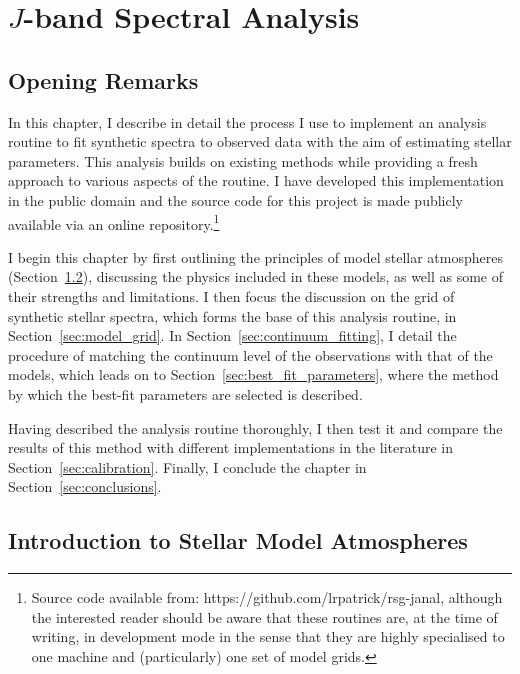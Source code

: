 \chapter{$J$-band Spectral Analysis}\label{ch:janal}
\renewcommand{\headrulewidth}{1pt}

\section{Opening Remarks} %
\label{sec:janalopening}

In this chapter, I describe in detail the process I use to implement an analysis
routine to fit synthetic spectra to observed data with the aim of estimating stellar parameters.
This analysis builds on existing methods while providing a fresh approach to various aspects of the routine.
I have developed this implementation in the public domain and the source code for this project is made publicly available
via an online repository.\footnote{Source code available from: https://github.com/lrpatrick/rsg-janal,
although the interested reader should be aware that these routines are, at the time of writing, in development mode
in the sense that they are highly specialised to one machine and (particularly) one set of model grids.}

I begin this chapter by first outlining the principles of model stellar atmospheres
(Section~\ref{sec:model_atmospheres}), discussing the physics included in these models, as well as some of their strengths and limitations.
I then focus the discussion on the grid of synthetic stellar spectra, which forms the base of this analysis routine, in Section~\ref{sec:model_grid}.
In Section~\ref{sec:continuum_fitting}, I detail the procedure of matching the continuum level of the observations with that of the models,
which leads on to Section~\ref{sec:best_fit_parameters}, where the method by which the best-fit parameters are selected is described.

Having described the analysis routine thoroughly, I then test it and compare the results of this method with different implementations in the literature in Section~\ref{sec:calibration}.
Finally, I conclude the chapter in Section~\ref{sec:conclusions}.

\section{Introduction to Stellar Model Atmospheres} %
\label{sec:model_atmospheres}

